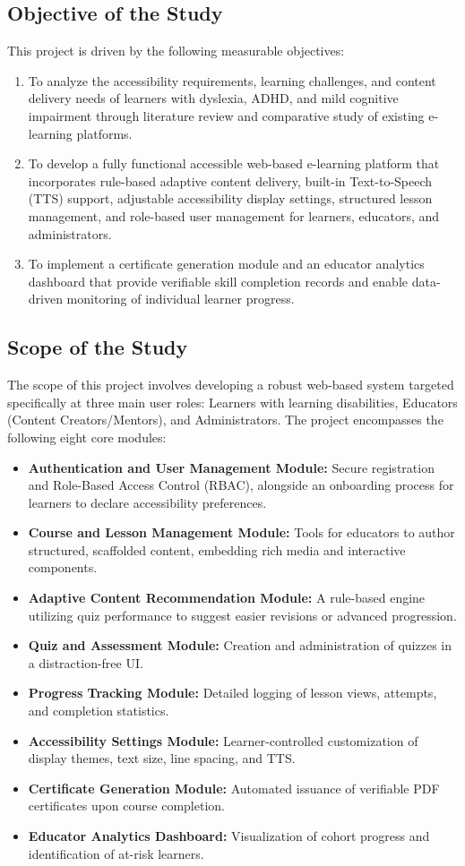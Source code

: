 \documentclass[12pt,a4paper]{report}
\begin{document}
\subsection{Objective of the Study}
This project is driven by the following measurable objectives:
\begin{enumerate}
\item To analyze the accessibility requirements, learning challenges, and content delivery needs of learners with dyslexia, ADHD, and mild cognitive impairment through literature review and comparative study of existing e-learning platforms.
\item To develop a fully functional accessible web-based e-learning platform that incorporates rule-based adaptive content delivery, built-in Text-to-Speech (TTS) support, adjustable accessibility display settings, structured lesson management, and role-based user management for learners, educators, and administrators.
\item To implement a certificate generation module and an educator analytics dashboard that provide verifiable skill completion records and enable data-driven monitoring of individual learner progress.
\end{enumerate}

\subsection{Scope of the Study}
The scope of this project involves developing a robust web-based system targeted specifically at three main user roles: Learners with learning disabilities, Educators (Content Creators/Mentors), and Administrators. The project encompasses the following eight core modules:
\begin{itemize}[itemsep=-1mm]
\item \textbf{Authentication and User Management Module:} Secure registration and Role-Based Access Control (RBAC), alongside an onboarding process for learners to declare accessibility preferences.
\item \textbf{Course and Lesson Management Module:} Tools for educators to author structured, scaffolded content, embedding rich media and interactive components.
\item \textbf{Adaptive Content Recommendation Module:} A rule-based engine utilizing quiz performance to suggest easier revisions or advanced progression.
\item \textbf{Quiz and Assessment Module:} Creation and administration of quizzes in a distraction-free UI.
\item \textbf{Progress Tracking Module:} Detailed logging of lesson views, attempts, and completion statistics.
\item \textbf{Accessibility Settings Module:} Learner-controlled customization of display themes, text size, line spacing, and TTS.
\item \textbf{Certificate Generation Module:} Automated issuance of verifiable PDF certificates upon course completion.
\item \textbf{Educator Analytics Dashboard:} Visualization of cohort progress and identification of at-risk learners.
\end{itemize}
\end{document}
